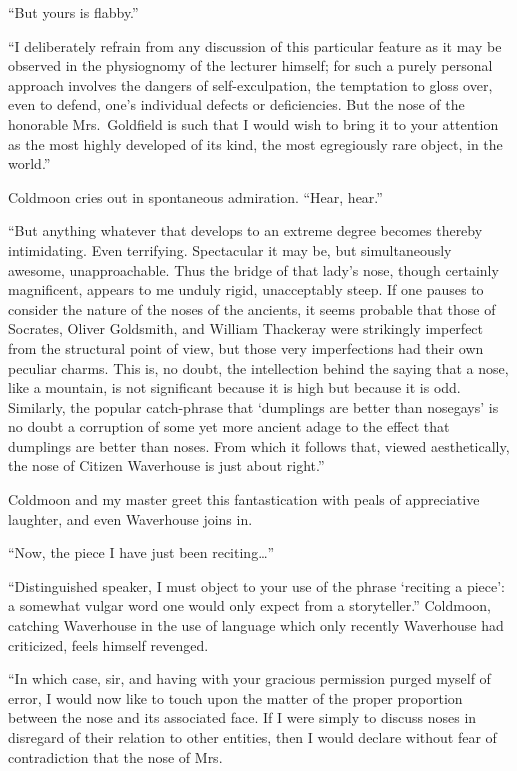 \documentclass{book}
\begin{document}
``But yours is flabby.''

``I deliberately refrain from any discussion of this particular feature
as it may be observed in the physiognomy of the lecturer himself; for
such a purely personal approach involves the dangers of
self-exculpation, the temptation to gloss over, even to defend, one's
individual defects or deficiencies. But the nose of the honorable
Mrs.~Goldfield is such that I would wish to bring it to your attention
as the most highly developed of its kind, the most egregiously rare
object, in the world.''

Coldmoon cries out in spontaneous admiration. ``Hear, hear.''

``But anything whatever that develops to an extreme degree becomes
thereby intimidating. Even terrifying. Spectacular it may be, but
simultaneously awesome, unapproachable. Thus the bridge of that lady's
nose, though certainly magnificent, appears to me unduly rigid,
unacceptably steep. If one pauses to consider the nature of the noses of
the ancients, it seems probable that those of Socrates, Oliver
Goldsmith, and William Thackeray were strikingly imperfect from the
structural point of view, but those very imperfections had their own
peculiar charms. This is, no doubt, the intellection behind the saying
that a nose, like a mountain, is not significant because it is high but
because it is odd. Similarly, the popular catch-phrase that `dumplings
are better than nosegays' is no doubt a corruption of some yet more
ancient adage to the effect that dumplings are better than noses. From
which it follows that, viewed aesthetically, the nose of Citizen
Waverhouse is just about right.''

Coldmoon and my master greet this fantastication with peals of
appreciative laughter, and even Waverhouse joins in.

``Now, the piece I have just been reciting\ldots{}''

``Distinguished speaker, I must object to your use of the phrase
`reciting a piece': a somewhat vulgar word one would only expect from a
storyteller.'' Coldmoon, catching Waverhouse in the use of language
which only recently Waverhouse had criticized, feels himself revenged.

``In which case, sir, and having with your gracious permission purged
myself of error, I would now like to touch upon the matter of the proper
proportion between the nose and its associated face. If I were simply to
discuss noses in disregard of their relation to other entities, then I
would declare without fear of contradiction that the nose of Mrs.
\end{document}
